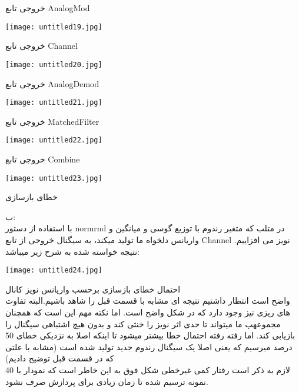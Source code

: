 \centering
خروجی تابع AnalogMod
 

\begin{center}
    \texttt{[image: untitled19.jpg]}
\end{center}

\centering
خروجی تابع Channel
 

\begin{center}
    \texttt{[image: untitled20.jpg]}
\end{center}

\centering
خروجی تابع AnalogDemod
 

\begin{center}
    \texttt{[image: untitled21.jpg]}
\end{center}

\centering
خروجی تابع MatchedFilter
 

\begin{center}
    \texttt{[image: untitled22.jpg]}
\end{center}

\centering
خروجی تابع Combine
 

\begin{center}
    \texttt{[image: untitled23.jpg]}
\end{center}

\centering
خطای بازسازی


\raggedleft
ب:
\\
با استفاده از دستور normrnd در متلب که متغیر رندوم با توزیع گوسی و میانگین و واریانس دلخواه ما تولید میکند، به سیگنال خروجی از تابع Channel نویز می افزاییم. نتیجه خواسته شده به شرح زیر میباشد:


\begin{center}
    \texttt{[image: untitled24.jpg]}
\end{center}

\centering
احتمال خطای بازسازی برحسب واریانس نویز کانال
\\[0.5cm]
\raggedleft
\justify
واضح است انتظار داشتیم نتیجه ای مشابه با قسمت قبل را شاهد باشیم.البته تفاوت های ریزی نیز وجود دارد که در شکل واضح است. اما نکته مهم این است که همچنان مجموعهپ ما میتواند تا حدی اثر نویز را خنثی کند و بدون هیچ اشتباهی سیگنال را بازیابی کند. اما رفته رفته احتمال خطا بیشتر میشود تا اینکه اصلا به نزدیکی خطای 50 درصد میرسیم که یعنی اصلا یک سیگنال رندوم جدید تولید شده است (مشابه با علتی که در قسمت قبل توضیح دادیم)
\\
لازم به ذکر است رفتار کمی غیرخطی شکل فوق به این خاطر است که نمودار با 40 نمونه ترسیم شده تا زمان زیادی برای پردازش صرف نشود.
\\[1cm]



